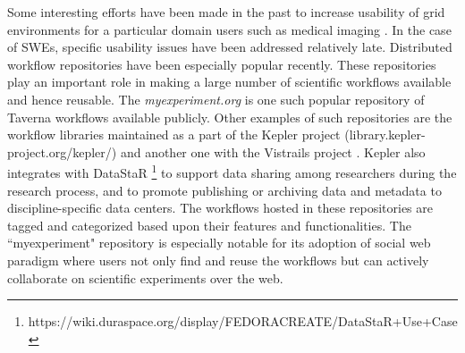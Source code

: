 Some interesting efforts have been made in the past to increase usability of
grid environments for a particular domain users such as medical imaging
\cite{olabarriaga-deboer-etal:2006,olabarriaga-glatard-etal:2008}. In the case
of SWEs, specific usability issues have been addressed relatively late.
Distributed workflow repositories \cite{stoyanovich-taskar-etal:2010} have been
especially popular recently. These repositories play an important role in
making a large number of scientific workflows available and hence reusable. The
\textit{myexperiment.org} \cite{deroure-goble-etal:2008} is one such popular
repository of Taverna workflows available publicly. Other examples of such
repositories are the workflow libraries maintained as a part of the Kepler
project (library.kepler-project.org/kepler/) and another one with the Vistrails
project \cite{callahan-freire-etal:2006}. Kepler also integrates with DataStaR
\footnote{https://wiki.duraspace.org/display/FEDORACREATE/DataStaR+Use+Case} to
support data sharing among researchers during the research process, and to
promote publishing or archiving data and metadata to discipline-specific data
centers. The workflows hosted in these repositories are tagged and categorized
based upon their features and functionalities. The ``myexperiment" repository
is especially notable for its adoption of social web paradigm where users not
only find and reuse the workflows but can actively collaborate on scientific
experiments over the web.
